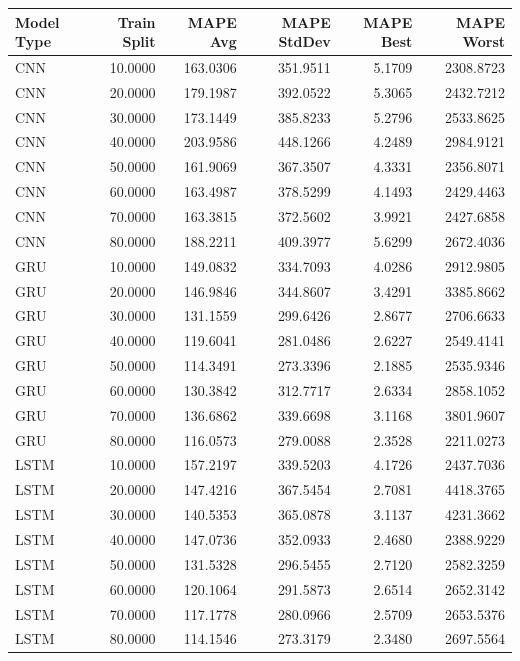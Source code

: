 \begin{tabular}{lrrrrr}
\toprule
Model Type & Train Split & MAPE Avg & MAPE StdDev & MAPE Best & MAPE Worst \\
\midrule
CNN & 10.0000 & 163.0306 & 351.9511 & 5.1709 & 2308.8723 \\
CNN & 20.0000 & 179.1987 & 392.0522 & 5.3065 & 2432.7212 \\
CNN & 30.0000 & 173.1449 & 385.8233 & 5.2796 & 2533.8625 \\
CNN & 40.0000 & 203.9586 & 448.1266 & 4.2489 & 2984.9121 \\
CNN & 50.0000 & 161.9069 & 367.3507 & 4.3331 & 2356.8071 \\
CNN & 60.0000 & 163.4987 & 378.5299 & 4.1493 & 2429.4463 \\
CNN & 70.0000 & 163.3815 & 372.5602 & 3.9921 & 2427.6858 \\
CNN & 80.0000 & 188.2211 & 409.3977 & 5.6299 & 2672.4036 \\
GRU & 10.0000 & 149.0832 & 334.7093 & 4.0286 & 2912.9805 \\
GRU & 20.0000 & 146.9846 & 344.8607 & 3.4291 & 3385.8662 \\
GRU & 30.0000 & 131.1559 & 299.6426 & 2.8677 & 2706.6633 \\
GRU & 40.0000 & 119.6041 & 281.0486 & 2.6227 & 2549.4141 \\
GRU & 50.0000 & 114.3491 & 273.3396 & 2.1885 & 2535.9346 \\
GRU & 60.0000 & 130.3842 & 312.7717 & 2.6334 & 2858.1052 \\
GRU & 70.0000 & 136.6862 & 339.6698 & 3.1168 & 3801.9607 \\
GRU & 80.0000 & 116.0573 & 279.0088 & 2.3528 & 2211.0273 \\
LSTM & 10.0000 & 157.2197 & 339.5203 & 4.1726 & 2437.7036 \\
LSTM & 20.0000 & 147.4216 & 367.5454 & 2.7081 & 4418.3765 \\
LSTM & 30.0000 & 140.5353 & 365.0878 & 3.1137 & 4231.3662 \\
LSTM & 40.0000 & 147.0736 & 352.0933 & 2.4680 & 2388.9229 \\
LSTM & 50.0000 & 131.5328 & 296.5455 & 2.7120 & 2582.3259 \\
LSTM & 60.0000 & 120.1064 & 291.5873 & 2.6514 & 2652.3142 \\
LSTM & 70.0000 & 117.1778 & 280.0966 & 2.5709 & 2653.5376 \\
LSTM & 80.0000 & 114.1546 & 273.3179 & 2.3480 & 2697.5564 \\

\end{tabular}
